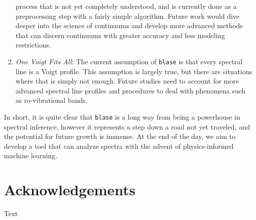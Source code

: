 \documentclass[twocolumn]{aastex631}
\begin{document}
\begin{enumerate}[label=-]
    process that is not yet completely understood, and is currently done as 
    a preprocessing step with a fairly simple algorithm. Future work would
    dive deeper into the science of continuums and develop more advanced 
    methods that can discern continuums with greater accuracy and less
    modeling restrictions.
    \item \textit{One Voigt Fits All}: The current assumption of \texttt{blase}
    is that every spectral line is a Voigt profile. This assumption is largely
    true, but there are situations where that is simply not enough. Future
    studies need to account for more advanced spectral line profiles and 
    procedures to deal with phenomena such as ro-vibrational bands.
\end{enumerate}
In short, it is quite clear that \texttt{blase} is a long way from being a
powerhouse in spectral inference, however it represents a step down a road
not yet traveled, and the potential for future growth is immense. At the 
end of the day, we aim to develop a tool that can analyze spectra with the 
advent of physics-informed machine learning.

\section*{Acknowledgements}
Text
\end{document}
